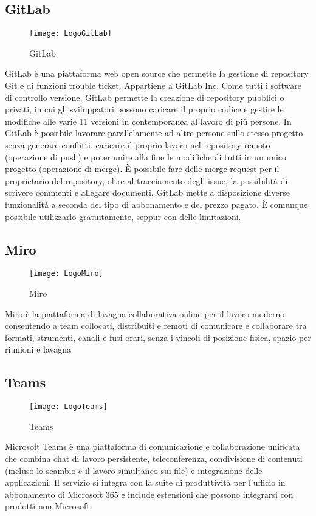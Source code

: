 \subsection{GitLab}
\begin{figure}[htpb!]
\center
  \texttt{[image: LogoGitLab]}
  \caption{GitLab}
\end{figure}
GitLab è una piattaforma web open source che permette la gestione di repository Git e di funzioni trouble ticket. Appartiene a GitLab Inc.
Come tutti i software di controllo versione, GitLab permette la creazione di repository pubblici o privati, in cui gli sviluppatori possono caricare il proprio codice e gestire le modifiche alle varie
11
versioni in contemporanea al lavoro di più persone. In GitLab è possibile lavorare parallelamente ad altre persone sullo stesso progetto senza generare conflitti, caricare il proprio lavoro nel repository remoto (operazione di push) e poter unire alla fine le modifiche di tutti in un unico progetto (operazione di merge). È possibile fare delle merge request per il proprietario del repository, oltre al tracciamento degli issue, la possibilità di scrivere commenti e allegare documenti. GitLab mette a disposizione diverse funzionalità a seconda del tipo di abbonamento e del prezzo pagato. È comunque possibile utilizzarlo gratuitamente, seppur con delle limitazioni.
\subsection{Miro}
\begin{figure}[htpb!]
\center
  \texttt{[image: LogoMiro]}
  \caption{Miro}
\end{figure}
Miro è la piattaforma di lavagna collaborativa online per il lavoro moderno, consentendo a team collocati, distribuiti e remoti di comunicare e collaborare tra formati, strumenti, canali e fusi orari, senza i vincoli di posizione fisica, spazio per riunioni e lavagna
\subsection{Teams}
\begin{figure}[htpb!]
\center
  \texttt{[image: LogoTeams]}
  \caption{Teams}
\end{figure}
Microsoft Teams è una piattaforma di comunicazione e collaborazione unificata che combina chat di lavoro persistente, teleconferenza, condivisione di contenuti (incluso lo scambio e il lavoro simultaneo sui file) e integrazione delle applicazioni. Il servizio si integra con la suite di produttività per l'ufficio in abbonamento di Microsoft 365 e include estensioni che possono integrarsi con prodotti non Microsoft.
